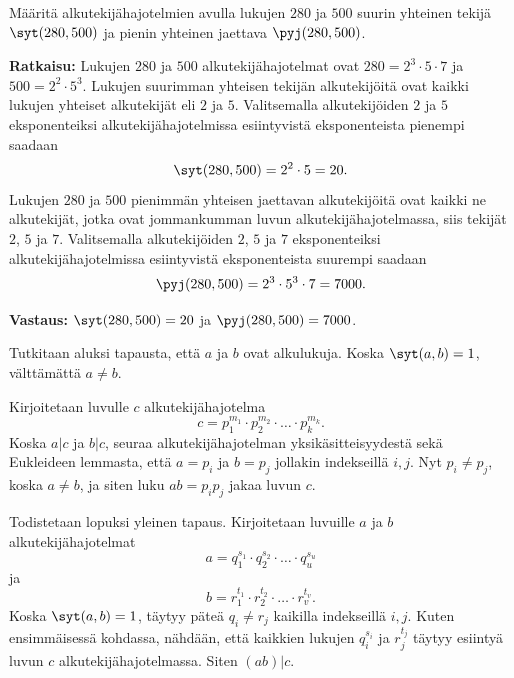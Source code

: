 \begin{esimerkki}
Määritä alkutekijähajotelmien avulla lukujen $280$ ja $500$
suurin yhteinen tekijä $\syt(280, 500)$ ja pienin yhteinen
jaettava $\pyj(280, 500)$.

{\bf Ratkaisu:}
Lukujen $280$ ja $500$ alkutekijähajotelmat ovat $280 = 2^3
\cdot 5\cdot 7$ ja $500 = 2^2\cdot 5^3$. Lukujen suurimman
yhteisen tekijän alkutekijöitä ovat kaikki lukujen yhteiset
alkutekijät eli $2$ ja $5$. Valitsemalla alkutekijöiden $2$
ja $5$ eksponenteiksi alkutekijähajotelmissa esiintyvistä
eksponenteista pienempi saadaan
\[
\syt(280, 500) = 2^2 \cdot 5 = 20.
\]
Lukujen $280$ ja $500$ pienimmän yhteisen jaettavan alkutekijöitä
ovat kaikki ne alkutekijät, jotka ovat jommankumman luvun
alkutekijähajotelmassa, siis tekijät $2$, $5$ ja $7$.
Valitsemalla alkutekijöiden $2$, $5$ ja $7$ eksponenteiksi
alkutekijähajotelmissa esiintyvistä eksponenteista suurempi
saadaan
\[
\pyj(280, 500) = 2^3\cdot 5^3 \cdot 7 = 7000.
\]

{\bf Vastaus:} $\syt(280, 500) = 20$ ja $\pyj(280, 500) = 7000$.
\end{esimerkki}


\begin{todistus}
Tutkitaan aluksi tapausta, että $a$ ja $b$ ovat alkulukuja. Koska $\syt(a,b)=1$, välttämättä $a\neq b$.

Kirjoitetaan luvulle $c$ alkutekijähajotelma
\[
c=  p_1^{m_1} \cdot p_2^{m_2} \cdot \ldots \cdot p_k^{m_k}.
\]
Koska $a|c$ ja $b|c$, seuraa alkutekijähajotelman yksikäsitteisyydestä sekä Eukleideen lemmasta, että $a=p_i$ ja $b=p_j$ jollakin indekseillä $i,j$. Nyt $p_i\neq p_j$, koska $a\neq b$, ja siten luku $ab=p_ip_j$ jakaa luvun $c$.

Todistetaan lopuksi yleinen tapaus. Kirjoitetaan luvuille $a$ ja $b$ alkutekijähajotelmat
\[
a=q_1^{s_1} \cdot q_2^{s_2} \cdot \ldots \cdot q_u^{s_u}
\]
ja
\[
b=r_1^{t_1} \cdot r_2^{t_2} \cdot \ldots \cdot r_v^{t_v}.
\]
Koska $\syt(a,b)=1$, täytyy päteä $q_i\neq r_j$ kaikilla indekseillä $i,j$. Kuten ensimmäisessä kohdassa, nähdään, että kaikkien lukujen $q_i^{s_i}$ ja $r_j^{t_j}$ täytyy esiintyä luvun $c$ alkutekijähajotelmassa. Siten $(ab)|c$.
\end{todistus}

